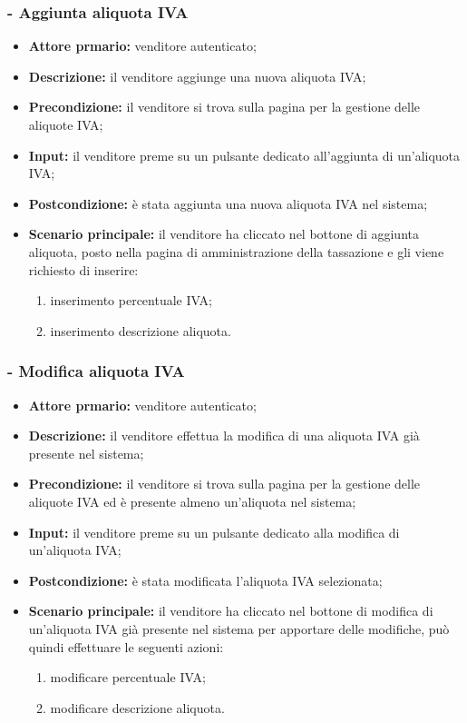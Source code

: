 \subsubsection{- Aggiunta aliquota IVA}
\begin{itemize}
    \item \textbf{Attore prmario:} venditore autenticato;
    \item \textbf{Descrizione:} il venditore aggiunge una nuova aliquota IVA;
    \item \textbf{Precondizione:} il venditore si trova sulla pagina per la gestione delle aliquote IVA;
    \item \textbf{Input:} il venditore preme su un pulsante dedicato all'aggiunta di un'aliquota IVA;
    \item \textbf{Postcondizione:} è stata aggiunta una nuova aliquota IVA nel sistema;
    \item \textbf{Scenario principale:} il venditore ha cliccato nel bottone di aggiunta aliquota, posto nella pagina di amministrazione della tassazione e gli viene richiesto di inserire:
          \begin{enumerate}
              \item inserimento percentuale IVA;
              \item inserimento descrizione aliquota.
          \end{enumerate}
\end{itemize}

\stepsubUserCase
\subsubsection{- Modifica aliquota IVA}
\begin{itemize}
    \item \textbf{Attore prmario:} venditore autenticato;
    \item \textbf{Descrizione:} il venditore effettua la modifica di una aliquota IVA già presente nel sistema;
    \item \textbf{Precondizione:} il venditore si trova sulla pagina per la gestione delle aliquote IVA ed è presente almeno un'aliquota nel sistema;
    \item \textbf{Input:} il venditore preme su un pulsante dedicato alla modifica di un'aliquota IVA;
    \item \textbf{Postcondizione:} è stata modificata l'aliquota IVA selezionata;
    \item \textbf{Scenario principale:} il venditore ha cliccato nel bottone di modifica di un’aliquota IVA già presente nel sistema per apportare delle modifiche, può quindi effettuare le seguenti azioni:
          \begin{enumerate}
              \item modificare percentuale IVA;
              \item modificare descrizione aliquota.
          \end{enumerate}
\end{itemize}

